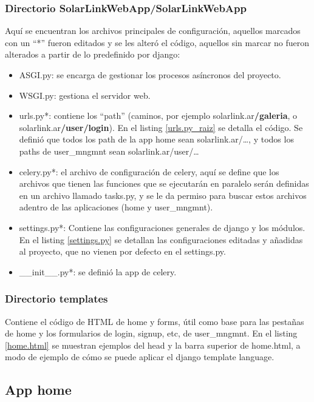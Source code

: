 \subsubsection{Directorio SolarLinkWebApp/SolarLinkWebApp}

Aquí se encuentran los archivos principales de configuración, aquellos marcados con un “*” fueron editados y se les alteró el código, aquellos sin marcar no fueron alterados a partir de lo predefinido por django:\\

\begin{itemize}
    \item ASGI.py: se encarga de gestionar los procesos asíncronos del proyecto.
    \item WSGI.py: gestiona el servidor web.
    \item urls.py*: contiene los “path” (caminos, por ejemplo solarlink.ar\textbf{/galeria}, o solarlink.ar\textbf{/user/login}). En el listing \ref{urls.py_raiz} se detalla el código. Se definió que todos los path de la app home sean solarlink.ar/…, y todos los paths de user\_mngmnt sean solarlink.ar/user/… 
    \item celery.py*: el archivo de configuración de celery, aquí se define que los archivos que tienen las funciones que se ejecutarán en paralelo serán definidas en un archivo llamado tasks.py, y se le da permiso para buscar estos archivos adentro de las aplicaciones (home y user\_mngmnt).
    \item settings.py*: Contiene las configuraciones generales de django y los módulos. En el listing \ref{settings.py} se detallan las configuraciones editadas y añadidas al proyecto, que no vienen por defecto en el settings.py.
    \item \_\_init\_\_.py*: se definió la app de celery.
    
\end{itemize}

\subsubsection{Directorio templates}

Contiene el código de HTML de home y forms, útil como base para las pestañas de home y los formularios de login, signup, etc, de user\_mngmnt. En el listing \ref{home.html} se muestran ejemplos del head y la barra superior de home.html, a modo de ejemplo de cómo se puede aplicar el django template language.

\subsection{App home}

